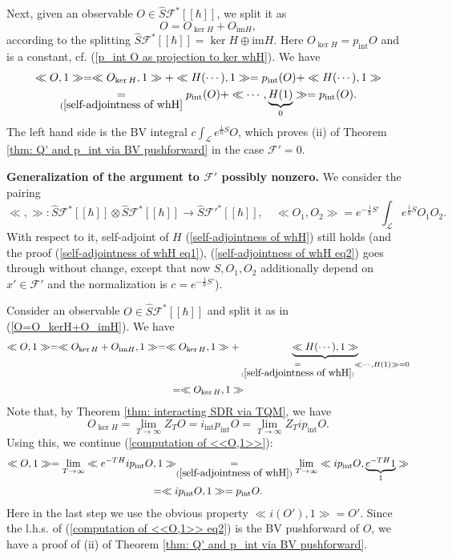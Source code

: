 \documentclass{amsart}
\theoremstyle{plain} %
\theoremstyle{definition}
\theoremstyle{remark}
\newcommand{\mr}{\mathrm}
\newcommand{\ra}{\rightarrow}
\newcommand{\F}{\mathcal{F}}
\newcommand{\LL}{\mathcal{L}}
\newcommand{\ii}{\mathrm{int}}
\newcommand{\iii}{\mathrm{i}}
\newcommand{\fun}{\widehat{S}\mathcal{F}^*[[\hbar]]}
\newcommand{\funprime}{\widehat{S}\mathcal{F'}^*[[\hbar]]}
\begin{document}
Next, given an observable $O\in \fun$, we split it as 
\begin{equation}\label{O=O_kerH+O_imH}
O=O_{\ker H}+O_{\mr{im}H},
\end{equation}
according to the splitting $\fun=\ker H\oplus \mr{im}H$. Here $O_{\ker H}=p_\ii O$ and is a constant, cf. (\ref{p_int O as projection to ker whH}).
We have
\begin{multline}
    \ll O,1 \gg= \ll O_{\ker H},1\gg + \ll H(\cdots),1 \gg=
    p_\ii(O)+ \ll H(\cdots),1 \gg \\
    \underset{(\ref{self-adjointness of whH}}{=}p_\ii(O)+ \ll \cdots, \underbrace{H(1)}_0\gg
    =p_\ii(O).
\end{multline}
The left hand side is the BV integral $c\int_\LL e^{\frac{\iii}{\hbar}S}O$, which proves (ii) of Theorem \ref{thm: Q' and p_int via BV pushforward} in the case $\F'=0$.

\textbf{Generalization of the argument to $\F'$ possibly nonzero.}
We consider the pairing
\begin{equation}
    \ll,\gg\colon \fun \otimes \fun\ra \funprime,\quad
    \ll O_1,O_2\gg=e^{-\frac{\iii}{\hbar}S'}\int_\LL e^{\frac{\iii}{\hbar}S}O_1 O_2.
\end{equation}
With respect to it, self-adjoint of $H$ (\ref{self-adjointness of whH}) still holds (and the proof (\ref{self-adjointness of whH eq1}), (\ref{self-adjointness of whH eq2}) goes through without change, except that now $S,O_1,O_2$ additionally depend on $x'\in \F'$ and the normalization is $c= e^{-\frac{\iii}{\hbar}S'}$).

Consider an observable $O\in\fun$ and split it as in (\ref{O=O_kerH+O_imH}). We have
\begin{multline}\label{computation of <<O,1>>}
    \ll O,1 \gg = \ll O_{\ker H}+ O_{\mr{im} H},1\gg =
    \ll O_{\ker H},1 \gg + \underbrace{\ll H(\cdots), 1\gg}_{\underset{(\ref{self-adjointness of whH})}{=}\ll \cdots, H(1) \gg=0}\\
    = \ll O_{\ker H},1 \gg
\end{multline}
Note that, by Theorem \ref{thm: interacting SDR via TQM}, we have
\begin{equation}
    O_{\ker H}=\lim_{T\ra\infty}Z_T O=i_\ii p_\ii O= \lim_{T\ra \infty} Z_T i p_\ii O.
\end{equation}
Using this, we continue (\ref{computation of <<O,1>>}):
\begin{multline}\label{computation of <<O,1>> eq2}
    \ll O,1\gg = \lim_{T\ra\infty} \ll e^{-TH}i p_\ii O,1 \gg \underset{(\ref{self-adjointness of whH})}{=} 
    \lim_{T\ra\infty} \ll i p_\ii O, \underbrace{e^{-TH}1}_1\gg\\=
    \ll i p_\ii O,1 \gg = p_\ii O.
\end{multline}
Here in the last step we use the obvious property $\ll i(O'),1 \gg=O'$. Since the l.h.s. of (\ref{computation of <<O,1>> eq2}) is the BV pushforward of $O$, we have a proof of (ii) of Theorem \ref{thm: Q' and p_int via BV pushforward}.
\end{document}
